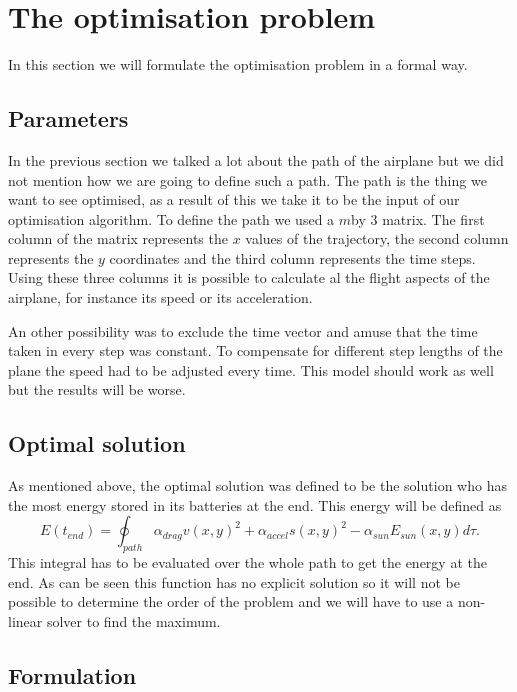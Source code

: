 \section{The optimisation problem}


In this section we will formulate the optimisation problem in a formal way.


\subsection{Parameters}

In the previous section we talked a lot about the path of the airplane but we did not mention how we are going to define such a path.
The path is the thing we want to see optimised, as a result of this we take it to be the input of our optimisation algorithm.
To define the path we used a $ m $by 3 matrix.
The first column of the matrix represents the $ x $ values of the trajectory, the second column represents the $ y $ coordinates and the third column represents the time steps.
Using these three columns it is possible to calculate al the flight aspects of the airplane, for instance its speed or its acceleration.

An other possibility was to exclude the time vector and amuse that the time taken in every step was constant.
To compensate for different step lengths of the plane the speed had to be adjusted every time.
This model should work as well but the results will be worse.

\subsection{Optimal solution}

As mentioned above, the optimal solution was defined to be the solution who has the most energy stored in its batteries at the end.
This energy will be defined as
\begin{equation}
E(t_{end}) = \oint_{path} \alpha_{drag}v(x,y)^2  + \alpha_{accel}  s(x,y)^2   -\alpha_{sun} E_{sun}(x,y)  d\tau.
\end{equation}
This integral has to be evaluated over the whole path to get the energy at the end.
As  can be seen this function has no explicit solution so it will not be possible to determine the order of the problem and we will have to use a non-linear solver to find the maximum.

\subsection{Formulation}

